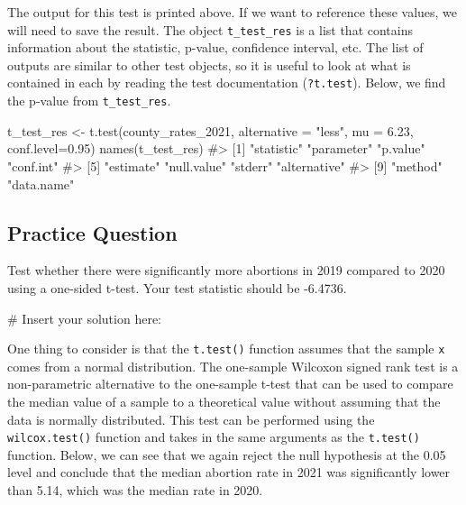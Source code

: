 \documentclass[
  letterpaper,
]{krantz}
\makeatletter
\newenvironment{Shaded}{\begin{snugshade}}{\end{snugshade}}
\newcommand{\AttributeTok}[1]{\textcolor[rgb]{0.40,0.45,0.13}{#1}}
\newcommand{\CommentTok}[1]{\textcolor[rgb]{0.37,0.37,0.37}{#1}}
\newcommand{\FloatTok}[1]{\textcolor[rgb]{0.68,0.00,0.00}{#1}}
\newcommand{\FunctionTok}[1]{\textcolor[rgb]{0.28,0.35,0.67}{#1}}
\newcommand{\NormalTok}[1]{\textcolor[rgb]{0.00,0.23,0.31}{#1}}
\newcommand{\OtherTok}[1]{\textcolor[rgb]{0.00,0.23,0.31}{#1}}
\newcommand{\SpecialCharTok}[1]{\textcolor[rgb]{0.37,0.37,0.37}{#1}}
\newcommand{\StringTok}[1]{\textcolor[rgb]{0.13,0.47,0.30}{#1}}
\newenvironment{kframe}{%
\medskip{}
\setlength{\fboxsep}{.8em}
 \def\at@end@of@kframe{}%
 \ifinner\ifhmode%
  \def\at@end@of@kframe{\end{minipage}}%
  \begin{minipage}{\columnwidth}%
 \fi\fi%
 \def\FrameCommand##1{\hskip\@totalleftmargin \hskip-\fboxsep
 \colorbox{shadecolor}{##1}\hskip-\fboxsep
     \hskip-\linewidth \hskip-\@totalleftmargin \hskip\columnwidth}%
 \MakeFramed {\advance\hsize-\width
   \@totalleftmargin\z@ \linewidth\hsize
   \@setminipage}}%
 {\par\unskip\endMakeFramed%
 \at@end@of@kframe}
\renewenvironment{Shaded}{\begin{kframe}}{\end{kframe}}
\makeatother
\begin{document}
The output for this test is printed above. If we want to reference these
values, we will need to save the result. The object
\texttt{t\_test\_res} is a list that contains information about the
statistic, p-value, confidence interval, etc. The list of outputs are
similar to other test objects, so it is useful to look at what is
contained in each by reading the test documentation (\texttt{?t.test}).
Below, we find the p-value from \texttt{t\_test\_res}.

\begin{Shaded}
\begin{Highlighting}[]
\NormalTok{t\_test\_res }\OtherTok{\textless{}{-}} \FunctionTok{t.test}\NormalTok{(county\_rates\_2021, }\AttributeTok{alternative =} \StringTok{"less"}\NormalTok{, }
                     \AttributeTok{mu =} \FloatTok{6.23}\NormalTok{, }\AttributeTok{conf.level=}\FloatTok{0.95}\NormalTok{)}
\FunctionTok{names}\NormalTok{(t\_test\_res)}
\CommentTok{\#\textgreater{}  [1] "statistic"   "parameter"   "p.value"     "conf.int"   }
\CommentTok{\#\textgreater{}  [5] "estimate"    "null.value"  "stderr"      "alternative"}
\CommentTok{\#\textgreater{}  [9] "method"      "data.name"}
\end{Highlighting}
\end{Shaded}

\begin{Shaded}
\end{Shaded}

\subsection{Practice Question}\label{practice-question-17}

Test whether there were significantly more abortions in 2019 compared to
2020 using a one-sided t-test. Your test statistic should be -6.4736.

\begin{Shaded}
\begin{Highlighting}[]
\CommentTok{\# Insert your solution here:}
\end{Highlighting}
\end{Shaded}

One thing to consider is that the \texttt{t.test()} function assumes
that the sample \texttt{x} comes from a normal distribution. The
one-sample Wilcoxon signed rank test is a non-parametric alternative to
the one-sample t-test that can be used to compare the median value of a
sample to a theoretical value without assuming that the data is normally
distributed. This test can be performed using the \texttt{wilcox.test()}
function and takes in the same arguments as the \texttt{t.test()}
function. Below, we can see that we again reject the null hypothesis at
the 0.05 level and conclude that the median abortion rate in 2021 was
significantly lower than 5.14, which was the median rate in 2020.
\end{document}
